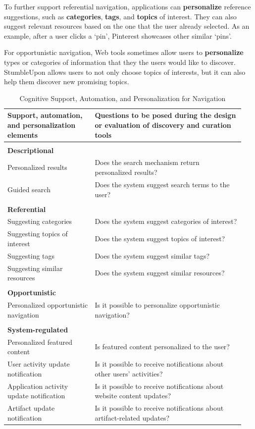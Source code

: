 \documentclass{sigchi}
\begin{document}
{{To further support referential navigation, applications can \textbf{personalize} reference suggestions, such as \textbf{categories}, \textbf{tags}, and \textbf{topics} of interest. They can also suggest relevant resources based on the one that the user already selected. As an example, after a user clicks a `pin', Pinterest showcases other similar `pins'.

For opportunistic navigation, Web tools sometimes allow users to \textbf{personalize} types or categories of information that they the users would like to discover. StumbleUpon allows users to not only choose topics of interests, but it can also help them discover new promising topics.

\begin{table}[ht!]
\caption{Cognitive Support, Automation, and Personalization for Navigation}
\label{table:navigation_support}
\begin{tabular}{|p{0.35\linewidth}|p{0.60\linewidth}|}
\hline
Support, automation, and personalization elements & Questions to be posed during the design or evaluation of discovery and curation tools \\
\hline
& \\
\textbf{Descriptional}       & \\
Personalized results         & Does the search mechanism return personalized results? \\
Guided search                & Does the system suggest search terms to the user? \\
& \\
\textbf{Referential}         & \\
Suggesting categories & Does the system suggest categories of interest? \\
Suggesting topics of interest & Does the system suggest topics of interest? \\
Suggesting tags              & Does the system suggest similar tags? \\
Suggesting similar resources & Does the system suggest similar resources? \\
& \\
\textbf{Opportunistic} & \\
Personalized opportunistic navigation     & Is it possible to personalize opportunistic navigation? \\
& \\
\textbf{System-regulated} & \\
Personalized featured content         & Is featured content personalized to the user? \\                                                       
User activity update notification & Is it possible to receive notifications about other users' activities? \\
Application activity update notification & Is it possible to receive notifications about website content updates?\\
Artifact update notification & Is it possible to receive notifications about artifact-related updates? \\                                                       
\hline


\end{tabular}
\end{table}}}
\end{document}
